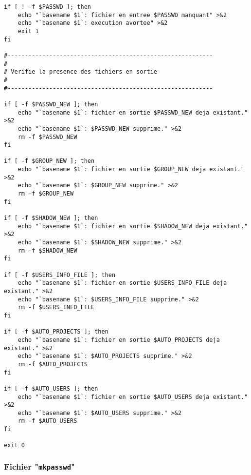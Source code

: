 \begin{verbatim}
if [ ! -f $PASSWD ]; then
    echo "`basename $1`: fichier en entree $PASSWD manquant" >&2
    echo "`basename $1`: execution avortee" >&2
    exit 1
fi

#-----------------------------------------------------------
#
# Verifie la presence des fichiers en sortie
#
#-----------------------------------------------------------

if [ -f $PASSWD_NEW ]; then
    echo "`basename $1`: fichier en sortie $PASSWD_NEW deja existant." >&2
    echo "`basename $1`: $PASSWD_NEW supprime." >&2
    rm -f $PASSWD_NEW
fi

if [ -f $GROUP_NEW ]; then
    echo "`basename $1`: fichier en sortie $GROUP_NEW deja existant." >&2
    echo "`basename $1`: $GROUP_NEW supprime." >&2
    rm -f $GROUP_NEW
fi

if [ -f $SHADOW_NEW ]; then
    echo "`basename $1`: fichier en sortie $SHADOW_NEW deja existant." >&2
    echo "`basename $1`: $SHADOW_NEW supprime." >&2
    rm -f $SHADOW_NEW
fi

if [ -f $USERS_INFO_FILE ]; then
    echo "`basename $1`: fichier en sortie $USERS_INFO_FILE deja existant." >&2
    echo "`basename $1`: $USERS_INFO_FILE supprime." >&2
    rm -f $USERS_INFO_FILE
fi

if [ -f $AUTO_PROJECTS ]; then
    echo "`basename $1`: fichier en sortie $AUTO_PROJECTS deja existant." >&2
    echo "`basename $1`: $AUTO_PROJECTS supprime." >&2
    rm -f $AUTO_PROJECTS
fi

if [ -f $AUTO_USERS ]; then
    echo "`basename $1`: fichier en sortie $AUTO_USERS deja existant." >&2
    echo "`basename $1`: $AUTO_USERS supprime." >&2
    rm -f $AUTO_USERS
fi

exit 0
\end{verbatim}

\subsubsection{\texorpdfstring{\label{adv-programming-ex3-pgmpgm}Fichier "{\tt mkpasswd}"}{Fichier "mkpasswd"}}

